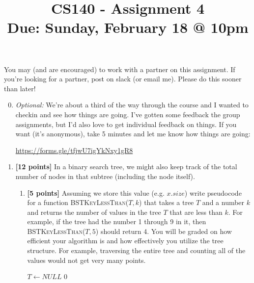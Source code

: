 \documentclass[11pt]{article}
\title{CS140 - Assignment 4\\\small{Due: Sunday, February 18 @ 10pm}}
\author{}
\date{}
\begin{document}
\maketitle

\vspace{-.5in}


\begin{center}
\end{center}

\noindent You may (and are encouraged) to work with a partner on this assignment. If you're looking for a partner, post on slack (or email me).  Please do this sooner than later!\\

\begin{enumerate}

\setcounter{enumi}{-1}

\item \emph{Optional:} We're about a third of the way through the course and I wanted to checkin and see how things are going.  I've gotten some feedback the group assignments, but I'd also love to get individual feedback on things.  If you want (it's anonymous), take 5 minutes and let me know how things are going:

\url{https://forms.gle/tfjwU7igYkNxy1gR8}

\item \textbf{[12 points]} In a binary search tree, we might also keep track of the total number of nodes in that subtree (including the node itself).

\begin{enumerate}

\item \textbf{[5 points]} Assuming we store this value (e.g. $x.size$) write pseudocode for a function \textsc{BSTKeyLessThan($T,k$)} that takes a tree $T$ and a number $k$ and returns the number of values in the tree $T$ that are less than $k$.  For example, if the tree had the number 1 through 9 in it, then  \textsc{BSTKeyLessThan($T,5$)} should return 4.  You will be graded on how efficient your algorithm is and how effectively you utilize the tree structure.  For example, traversing the entire tree and counting all of the values would not get very many points.

\begin{codebox}
\li \If $T \leftarrow NULL$
\li     \space \space \space \space \Return $0$
    \End
    

\end{codebox}
\end{enumerate}
\end{enumerate}
\end{document}
